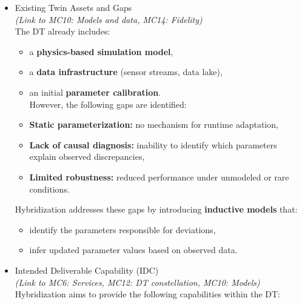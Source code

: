 \documentclass[
]{article}
\providecommand{\tightlist}{%
  \setlength{\itemsep}{0pt}\setlength{\parskip}{0pt}}
\begin{document}
\begin{itemize}
\begin{itemize}
\begin{itemize}
\begin{itemize}
\begin{itemize}
          The core problem can therefore be stated as follows:

          \begin{quote}
          \emph{How can the DT maintain alignment with the physical
          system despite evolving conditions, without requiring repeated
          manual recalibration?}
          \end{quote}
        \end{itemize}
      \item
        Existing Twin Assets and Gaps\\
        \emph{(Link to MC10: Models and data, MC14: Fidelity)}\\
        The DT already includes:

        \begin{itemize}
        \tightlist
        \item
          a \textbf{physics-based simulation model},
        \item
          a \textbf{data infrastructure} (sensor streams, data lake),
        \item
          an initial \textbf{parameter calibration}.\\
          However, the following gaps are identified:
        \item
          \textbf{Static parameterization:} no mechanism for runtime
          adaptation,
        \item
          \textbf{Lack of causal diagnosis:} inability to identify which
          parameters explain observed discrepancies,
        \item
          \textbf{Limited robustness:} reduced performance under
          unmodeled or rare conditions.
        \end{itemize}

        Hybridization addresses these gaps by introducing
        \textbf{inductive models} that:

        \begin{itemize}
        \tightlist
        \item
          identify the parameters responsible for deviations,
        \item
          infer updated parameter values based on observed data.
        \end{itemize}
      \item
        Intended Deliverable Capability (IDC)\\
        \emph{(Link to MC6: Services, MC12: DT constellation, MC10:
        Models)}\\
        Hybridization aims to provide the following capabilities within
        the DT:


\end{itemize}
\end{itemize}
\end{itemize}
\end{itemize}
\end{document}
